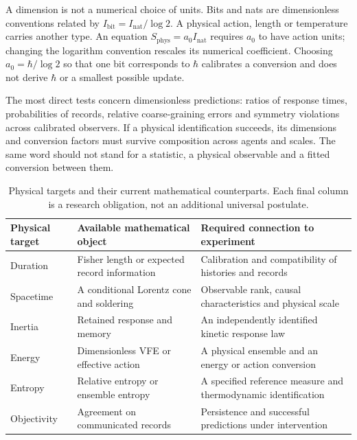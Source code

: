 A dimension is not a numerical choice of units. Bits and nats are dimensionless conventions related by $I_{\mathrm{bit}}=I_{\mathrm{nat}}/\log2$. A physical action, length or temperature carries another type. An equation $S_{\mathrm{phys}}=a_0I_{\mathrm{nat}}$ requires $a_0$ to have action units; changing the logarithm convention rescales its numerical coefficient. Choosing $a_0=\hbar/\log2$ so that one bit corresponds to $\hbar$ calibrates a conversion and does not derive $\hbar$ or a smallest possible update.

The most direct tests concern dimensionless predictions: ratios of response times, probabilities of records, relative coarse-graining errors and symmetry violations across calibrated observers. If a physical identification succeeds, its dimensions and conversion factors must survive composition across agents and scales. The same word should not stand for a statistic, a physical observable and a fitted conversion between them.

\begin{table}[ht]
\centering
\begin{tabularx}{\linewidth}{lXX}
\toprule
Physical target & Available mathematical object & Required connection to experiment \\
\midrule
Duration & Fisher length or expected record information & Calibration and compatibility of histories and records \\
Spacetime & A conditional Lorentz cone and soldering & Observable rank, causal characteristics and physical scale \\
Inertia & Retained response and memory & An independently identified kinetic response law \\
Energy & Dimensionless VFE or effective action & A physical ensemble and an energy or action conversion \\
Entropy & Relative entropy or ensemble entropy & A specified reference measure and thermodynamic identification \\
Objectivity & Agreement on communicated records & Persistence and successful predictions under intervention \\
\bottomrule
\end{tabularx}
\caption{Physical targets and their current mathematical counterparts. Each final column is a research obligation, not an additional universal postulate.}
\label{tab:physical_correspondences}
\end{table}
